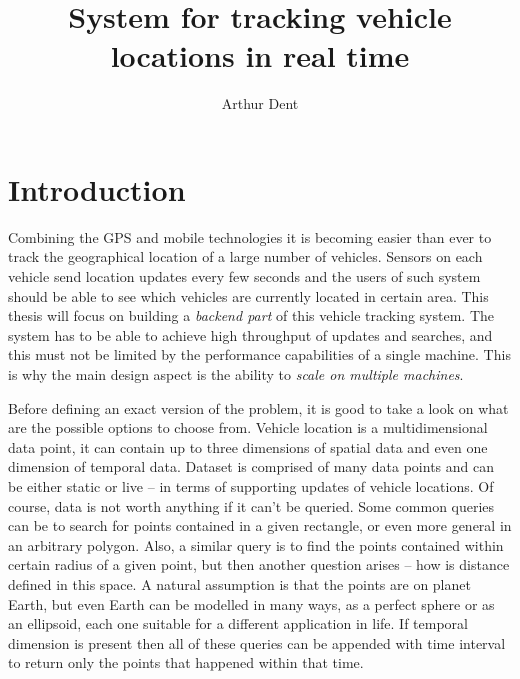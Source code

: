 \documentclass[times, utf8, diplomski]{fer}
\begin{document}

\title{System for tracking vehicle locations in real time}

\author{Arthur Dent}

\maketitle

\izvornik

\zahvala{}

\tableofcontents















\chapter{Introduction}
Combining the GPS and mobile technologies it is becoming easier than ever to track the geographical location of a large number of vehicles. Sensors on each vehicle send location updates every few seconds and the users of such system should be able to see which vehicles are currently located in certain area. This thesis will focus on building a \emph{backend part} of this vehicle tracking system. The system has to be able to achieve high throughput of updates and searches, and this must not be limited by the performance capabilities of a single machine. This is why the main design aspect is the ability to \emph{scale on multiple machines}.

Before defining an exact version of the problem, it is good to take a look on what are the possible options to choose from. Vehicle location is a multidimensional data point, it can contain up to three dimensions of spatial data and even one dimension of temporal data. Dataset is comprised of many data points and can be either static or live -- in terms of supporting updates of vehicle locations. Of course, data is not worth anything if it can't be queried. Some common queries can be to search for points contained in a given rectangle, or even more general in an arbitrary polygon. Also, a similar query is to find the points contained within certain radius of a given point, but then another question arises -- how is distance defined in this space. A natural assumption is that the points are on planet Earth, but even Earth can be modelled in many ways, as a perfect sphere or as an ellipsoid, each one suitable for a different application in life. If temporal dimension is present then all of these queries can be appended with time interval to return only the points that happened within that time.
\end{document}
